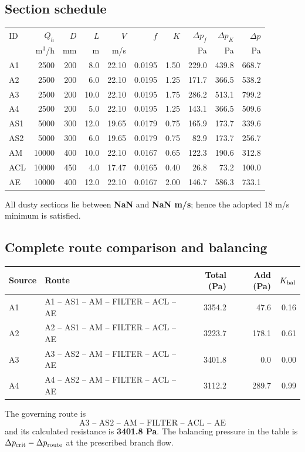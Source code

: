 \documentclass[11pt,a4paper]{article}
\begin{document}
\subsection{Section schedule}
\begin{center}\scriptsize
\begin{tabular}{lrrrrrrrrr}
\toprule
ID & $Q_h$ & $D$ & $L$ & $V$ & $f$ & $K$ & $\Delta p_f$ & $\Delta p_K$ & $\Delta p$\\
 & m$^3$/h & mm & m & m/s & & & Pa & Pa & Pa\\
\midrule
A1 & 2500 & 200 & 8.0 & 22.10 & 0.0195 & 1.50 & 229.0 & 439.8 & 668.7 \\
A2 & 2500 & 200 & 6.0 & 22.10 & 0.0195 & 1.25 & 171.7 & 366.5 & 538.2 \\
A3 & 2500 & 200 & 10.0 & 22.10 & 0.0195 & 1.75 & 286.2 & 513.1 & 799.2 \\
A4 & 2500 & 200 & 5.0 & 22.10 & 0.0195 & 1.25 & 143.1 & 366.5 & 509.6 \\
AS1 & 5000 & 300 & 12.0 & 19.65 & 0.0179 & 0.75 & 165.9 & 173.7 & 339.6 \\
AS2 & 5000 & 300 & 6.0 & 19.65 & 0.0179 & 0.75 & 82.9 & 173.7 & 256.7 \\
AM & 10000 & 400 & 10.0 & 22.10 & 0.0167 & 0.65 & 122.3 & 190.6 & 312.8 \\
ACL & 10000 & 450 & 4.0 & 17.47 & 0.0165 & 0.40 & 26.8 & 73.2 & 100.0 \\
AE & 10000 & 400 & 12.0 & 22.10 & 0.0167 & 2.00 & 146.7 & 586.3 & 733.1 \\
\bottomrule
\end{tabular}
\end{center}
All dusty sections lie between \textbf{NaN} and \textbf{NaN m/s}; hence the adopted 18 m/s minimum is satisfied.

\clearpage
\subsection{Complete route comparison and balancing}
\begin{center}\small
\begin{tabular}{llrrr}
\toprule
Source & Route & Total (Pa) & Add (Pa) & $K_{\rm bal}$\\
\midrule
A1 & A1 -- AS1 -- AM -- FILTER -- ACL -- AE & 3354.2 & 47.6 & 0.16 \\
A2 & A2 -- AS1 -- AM -- FILTER -- ACL -- AE & 3223.7 & 178.1 & 0.61 \\
A3 & A3 -- AS2 -- AM -- FILTER -- ACL -- AE & 3401.8 & 0.0 & 0.00 \\
A4 & A4 -- AS2 -- AM -- FILTER -- ACL -- AE & 3112.2 & 289.7 & 0.99 \\
\bottomrule
\end{tabular}
\end{center}
The governing route is
\[
\boxed{\text{A3 -- AS2 -- AM -- FILTER -- ACL -- AE}}
\]
and its calculated resistance is \textbf{3401.8 Pa}. The balancing pressure in the table is $\Delta p_{\rm crit}-\Delta p_{\rm route}$ at the prescribed branch flow.
\end{document}
